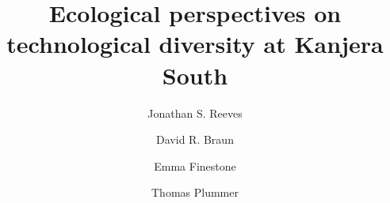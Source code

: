 \documentclass[]{elsarticle} %
\begin{document}
\begin{frontmatter}

  \title{Ecological perspectives on technological diversity at Kanjera South}
    \author[Eberhard Karls University of Tübingen]{Jonathan S. Reeves}
    \author[The George Washington University]{David R. Braun}
    \author[Max Planck Institute for the Science of Human History]{Emma Finestone}
    \author[The Graduate Center, City University of New York]{Thomas Plummer}
      \address[Eberhard Karls University of Tübingen]{Eberhard Karls University of Tübingen}
    \address[The George Washington University]{The George Washington University}
    \address[Max Planck Institute for the Science of Human History]{Max Planck Institute for the Science of Human History}
    \address[The Graduate Center, City University of New York]{The Graduate Center, City University of New York}
  

\end{frontmatter}
\end{document}

